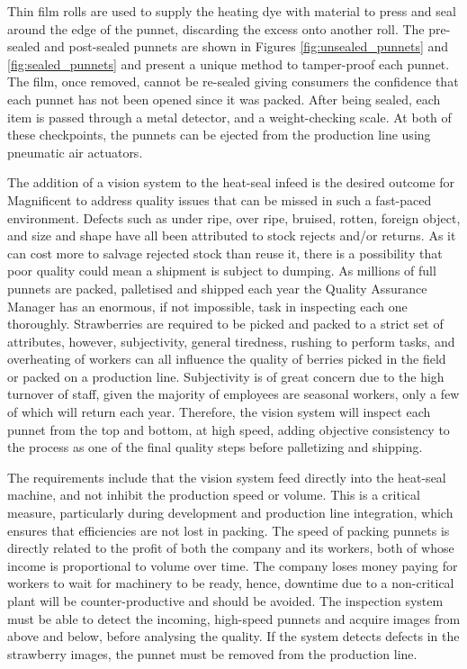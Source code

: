 \documentclass[fleqn,twoside,12pt]{report}
\begin{document}
Thin film rolls are used to supply the heating dye with material to press and seal around the edge of the punnet, discarding the excess onto another roll. The pre-sealed and post-sealed punnets are shown in Figures \ref{fig:unsealed_punnets} and \ref{fig:sealed_punnets} and present a unique method to tamper-proof each punnet. The film, once removed, cannot be re-sealed giving consumers the confidence that each punnet has not been opened since it was packed. After being sealed, each item is passed through a metal detector, and a weight-checking scale. At both of these checkpoints, the punnets can be ejected from the production line using pneumatic air actuators.

The addition of a vision system to the heat-seal infeed is the desired outcome for Magnificent to address quality issues that can be missed in such a fast-paced environment. Defects such as under ripe, over ripe, bruised, rotten, foreign object, and size and shape have all been attributed to stock rejects and/or returns. As it can cost more to salvage rejected stock than reuse it, there is a possibility that poor quality could mean a shipment is subject to dumping. As millions of full punnets are packed, palletised and shipped each year the Quality Assurance Manager has an enormous, if not impossible, task in inspecting each one thoroughly. Strawberries are required to be picked and packed to a strict set of attributes, however, subjectivity, general tiredness, rushing to perform tasks, and overheating of workers can all influence the quality of berries picked in the field or packed on a production line. Subjectivity is of great concern due to the high turnover of staff, given the majority of employees are seasonal workers, only a few of which will return each year. Therefore, the vision system will inspect each punnet from the top and bottom, at high speed, adding objective consistency to the process as one of the final quality steps before palletizing and shipping.


The requirements include that the vision system feed directly into the heat-seal machine, and not inhibit the production speed or volume. This is a critical measure, particularly during development and production line integration, which ensures that efficiencies are not lost in packing. The speed of packing punnets is directly related to the profit of both the company and its workers, both of whose income is proportional to volume over time. The company loses money paying for workers to wait for machinery to be ready, hence, downtime due to a non-critical plant will be counter-productive and should be avoided. The inspection system must be able to detect the incoming, high-speed punnets and acquire images from above and below, before analysing the quality. If the system detects defects in the strawberry images, the punnet must be removed from the production line. 
\end{document}
